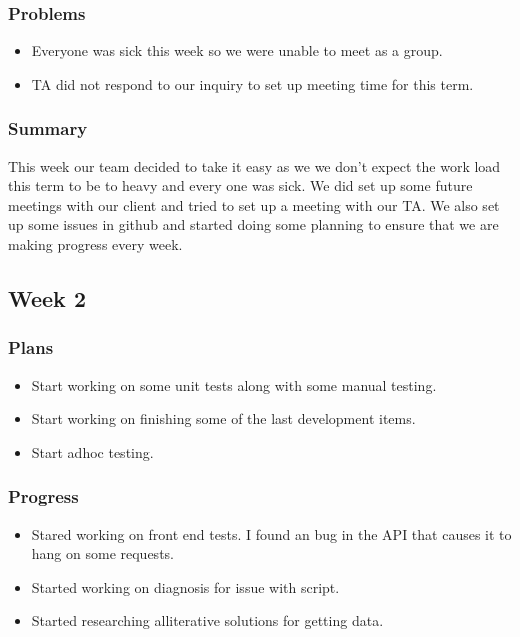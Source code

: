 \documentclass[onecolumn, draftclsnofoot,10pt, compsoc]{article}
\begin{document}
			\subsubsection{Problems}
			    \begin{itemize}
			        \item Everyone was sick this week so we were unable to meet as a group.\\
			        \item TA did not respond to our inquiry to set up meeting time for this term.\\
			    \end{itemize}
			\subsubsection{Summary} This week our team decided to take it easy as we we don't expect the work load this term to be to heavy and every one was sick. We did set up some future meetings with our client and tried to set up a meeting with our TA. We also set up some issues in github and started doing some planning to ensure that we are making progress every week.\\
			
		\subsection{Week 2}
			\subsubsection{Plans}
			    \begin{itemize}
			        \item Start working on some unit tests along with some manual testing.\\
			        \item Start working on finishing some of the last development items.\\
			        \item Start adhoc testing.\\
			    \end{itemize}
			\subsubsection{Progress}
			    \begin{itemize}
			        \item Stared working on front end tests. I found an bug in the API that causes it to hang on some requests.\\
			        \item Started working on diagnosis for issue with script.\\
			        \item Started researching alliterative solutions for getting data.\\
			    \end{itemize}
\end{document}
